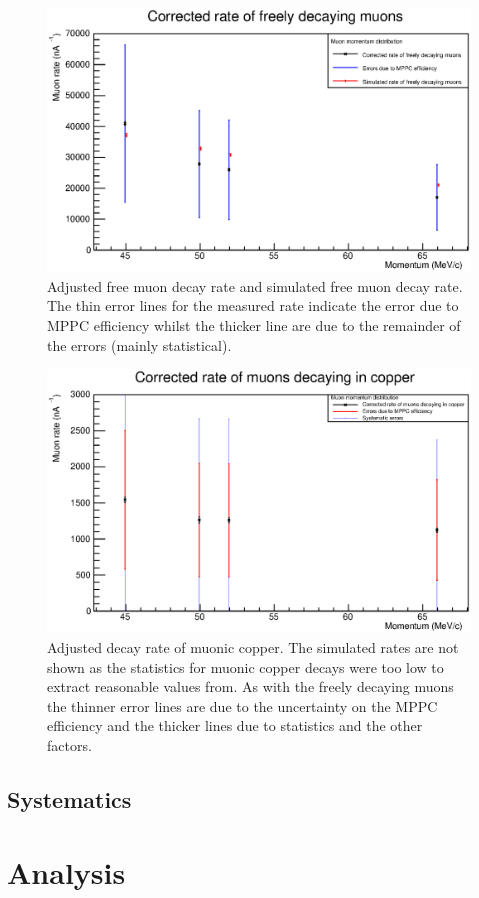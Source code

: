 \begin{figure}[hptb] 
  \centering
    \includegraphics[width=.9\textwidth]{images/plot_generating_scripts/adjusted_muon_rates.eps}
  \caption{Adjusted free muon decay rate and simulated free muon decay rate. The thin error lines for the measured rate indicate the error due to MPPC efficiency whilst the thicker line are due to the remainder of the errors (mainly statistical).}
  \label{fig:images_plot_generating_scripts_adjusted_muon_rates}
\end{figure}

\begin{figure}[hptb]
  \centering
    \includegraphics[width=.9\textwidth]{images/plot_generating_scripts/adjusted_muon_rates_cu.eps}
  \caption{Adjusted decay rate of muonic copper. The simulated rates are not shown as the statistics for muonic copper decays were too low to extract reasonable values from. As with the freely decaying muons the thinner error lines are due to the uncertainty on the MPPC efficiency and the thicker lines due to statistics and the other factors.}
  \label{fig:images_plot_generating_scripts_adjusted_muon_rates_cu}
\end{figure}

\subsection{Systematics} %
\label{sub:systematics}


\label{sec:results}
\section{Analysis} %
\label{sec:analysis}



